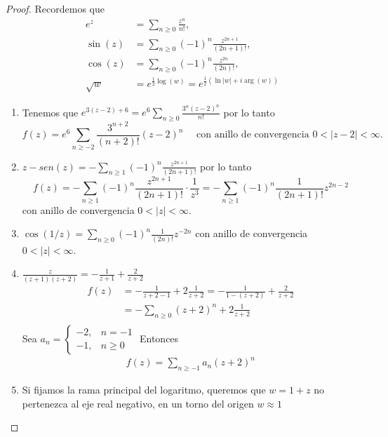 \documentclass{article}
\begin{document}
\begin{proof}
    Recordemos que \begin{align*}
        e^{z}    & = \sum_{n \geq 0} \frac{z^n}{n!},                                \\
        \sin(z)  & = \sum_{n \geq 0} {(-1)}^n \frac{z^{2n+1}}{(2n+1)!},             \\
        \cos(z)  & = \sum_{n \geq 0} {(-1)}^n \frac{z^{2n}}{(2n)!},                 \\
        \sqrt{w} & = e^{\frac{1}{2} \log(w)} = e^{\frac{1}{2} (\ln|w| + i \arg(w))}
    \end{align*}
    \begin{enumerate}
        \item Tenemos que \( e^{3(z-2) + 6} = e^6 \sum_{n \geq 0} \frac{3^n {(z-2)}^n}{n!} \) por lo tanto
              \[
                  f(z) = e^6 \sum_{n \geq -2} \frac{3^{n+2}}{(n+2)!} {(z-2)}^n \quad \text{ con anillo de convergencia } 0 < |z-2| < \infty.
              \]
        \item \( z - sen(z) = - \sum_{n \geq 1} {(-1)}^n \frac{z^{2n+1}}{(2n+1)!} \) por lo tanto
              \[
                  f(z) = - \sum_{n \geq 1} {(-1)}^n \frac{z^{2n+1}}{(2n+1)!} \cdot \frac{1}{z^3} = - \sum_{n \geq 1} {(-1)}^n \frac{1}{(2n+1)!} z^{2n-2}
              \]
              con anillo de convergencia \( 0 < |z| < \infty \).
        \item \( \cos(1/z) = \sum_{n \geq 0} {(-1)}^n \frac{1}{(2n)!} z^{-2n} \) con anillo de convergencia \( 0 < |z| < \infty \).
        \item \( \frac{z}{(z+1)(z+2)} = -\frac{1}{z+1} + \frac{2}{z+2} \) \begin{align*}
                  f(z) & = - \frac{1}{z+2-1} + 2 \frac{1}{z+2} = -\frac{1}{1 - (z+2)} + \frac{2}{z+2} \\
                       & = - \sum_{n \geq 0} {(z+2)}^n + 2 \frac{1}{z+2}                              \\
              \end{align*}
              Sea \( a_n = \begin{cases}
                  -2, & n = -1   \\
                  -1, & n \geq 0
              \end{cases}
              \)
              Entonces \begin{align*}
                  f(z) = \sum_{n \geq -1} a_n {(z+2)}^n
              \end{align*}
        \item Si fijamos la rama principal del logaritmo, queremos que \( w = 1 + z \) no pertenezca al eje real negativo, en un torno del origen \( w \approx 1 \)

\end{enumerate}
\end{proof}
\end{document}
